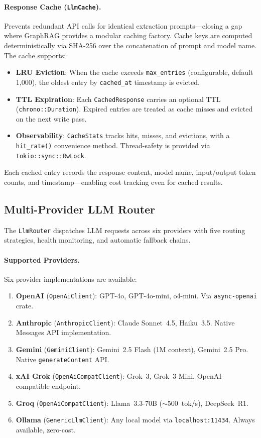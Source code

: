 \documentclass[11pt,a4paper,twocolumn]{article}
\begin{document}
\paragraph{Response Cache (\texttt{LlmCache}).}
Prevents redundant API calls for identical extraction prompts---closing
a gap where GraphRAG provides a modular caching factory. Cache keys are
computed deterministically via SHA-256 over the concatenation of prompt
and model name. The cache supports:
\begin{itemize}[leftmargin=*]
  \item \textbf{LRU Eviction}: When the cache exceeds
    \texttt{max\_entries} (configurable, default 1,000), the oldest
    entry by \texttt{cached\_at} timestamp is evicted.
  \item \textbf{TTL Expiration}: Each \texttt{CachedResponse} carries
    an optional TTL (\texttt{chrono::Duration}). Expired entries are
    treated as cache misses and evicted on the next write pass.
  \item \textbf{Observability}: \texttt{CacheStats} tracks hits,
    misses, and evictions, with a \texttt{hit\_rate()} convenience
    method. Thread-safety is provided via \texttt{tokio::sync::RwLock}.
\end{itemize}
Each cached entry records the response content, model name, input/output
token counts, and timestamp---enabling cost tracking even for cached
results.

\subsection{Multi-Provider LLM Router}
\label{sec:llmrouter}

The \texttt{LlmRouter} dispatches LLM requests across six providers
with five routing strategies, health monitoring, and automatic
fallback chains.

\paragraph{Supported Providers.}
Six provider implementations are available:
\begin{enumerate}[leftmargin=*]
  \item \textbf{OpenAI} (\texttt{OpenAiClient}): GPT-4o, GPT-4o-mini,
    o4-mini. Via \texttt{async-openai} crate.
  \item \textbf{Anthropic} (\texttt{AnthropicClient}): Claude
    Sonnet~4.5, Haiku~3.5. Native Messages API implementation.
  \item \textbf{Gemini} (\texttt{GeminiClient}): Gemini~2.5 Flash
    (1M context), Gemini~2.5 Pro. Native \texttt{generateContent} API.
  \item \textbf{xAI Grok} (\texttt{OpenAiCompatClient}): Grok~3,
    Grok~3 Mini. OpenAI-compatible endpoint.
  \item \textbf{Groq} (\texttt{OpenAiCompatClient}): Llama~3.3-70B
    ($\sim$500~tok/s), DeepSeek~R1.
  \item \textbf{Ollama} (\texttt{GenericLlmClient}): Any local model
    via \texttt{localhost:11434}. Always available, zero-cost.
\end{enumerate}
\end{document}
